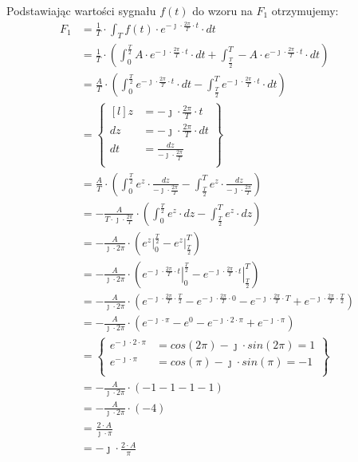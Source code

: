 \begin{task}
Podstawiając wartości sygnału $f(t)$ do wzoru na $F_1$ otrzymujemy:
\begin{align*}
F_1&=\frac{1}{T} \cdot \int_{T}f(t) \cdot e^{-\jmath \cdot \frac{2\pi}{T} \cdot t} \cdot dt\\
&=\frac{1}{T} \cdot \left(\int_{0}^{\frac{T}{2}}A \cdot e^{-\jmath \cdot \frac{2\pi}{T} \cdot t} \cdot dt + \int_{\frac{T}{2}}^{T}-A \cdot e^{-\jmath \cdot \frac{2\pi}{T} \cdot t} \cdot dt\right)\\
&=\frac{A}{T} \cdot \left(\int_{0}^{\frac{T}{2}}e^{-\jmath \cdot \frac{2\pi}{T} \cdot t} \cdot dt - \int_{\frac{T}{2}}^{T}e^{-\jmath \cdot \frac{2\pi}{T} \cdot t} \cdot dt\right)\\
&=\begin{Bmatrix*}[l]
z&=-\jmath \cdot \frac{2\pi}{T} \cdot t\\
dz&=-\jmath \cdot \frac{2\pi}{T} \cdot dt\\
dt&=\frac{dz}{-\jmath \cdot \frac{2\pi}{T}}\\
\end{Bmatrix*}\\
&=\frac{A}{T} \cdot \left(\int_{0}^{\frac{T}{2}} e^{z} \cdot \frac{dz}{-\jmath \cdot \frac{2\pi}{T}}-\int_{\frac{T}{2}}^{T} e^{z} \cdot \frac{dz}{-\jmath \cdot \frac{2\pi}{T}}\right)\\
&=-\frac{A}{T \cdot \jmath \cdot \frac{2\pi}{T}} \cdot \left(\int_{0}^{\frac{T}{2}} e^{z} \cdot dz - \int_{\frac{T}{2}}^{T} e^{z} \cdot dz\right)\\
&=-\frac{A}{\jmath \cdot 2 \pi} \cdot \left(\left. e^{z} \right|_{0}^{\frac{T}{2}} - \left. e^{z} \right|_{\frac{T}{2}}^{T}\right)\\
&=-\frac{A}{\jmath \cdot 2 \pi} \cdot \left(\left. e^{-\jmath \cdot \frac{2\pi}{T} \cdot t} \right|_{0}^{\frac{T}{2}} - \left. e^{-\jmath \cdot \frac{2\pi}{T} \cdot t} \right|_{\frac{T}{2}}^{T}\right)\\
&=-\frac{A}{\jmath \cdot 2 \pi} \cdot \left( e^{-\jmath \cdot \frac{2\pi}{T} \cdot \frac{T}{2}} - e^{-\jmath \cdot \frac{2\pi}{T} \cdot 0} -e^{-\jmath \cdot \frac{2\pi}{T} \cdot T} + e^{-\jmath \cdot \frac{2\pi}{T} \cdot \frac{T}{2}}\right)\\
&=-\frac{A}{\jmath \cdot 2 \pi} \cdot \left( e^{ -\jmath \cdot \pi } - e^{ 0} - e^{ -\jmath \cdot 2 \cdot \pi}+e^{ -\jmath \cdot \pi }\right)\\
&=\begin{Bmatrix}
e^{ -\jmath \cdot 2\cdot \pi }&=cos(2\pi)-\jmath \cdot sin(2\pi)=1\\
e^{ -\jmath \cdot \pi }&=cos(\pi)-\jmath \cdot sin(\pi)=-1\\
\end{Bmatrix}\\
&=-\frac{A}{\jmath \cdot 2 \pi} \cdot \left( -1 - 1 - 1 -1\right)\\
&=-\frac{A}{\jmath \cdot 2 \pi} \cdot \left( -4\right)\\
&=\frac{2 \cdot A}{\jmath \cdot \pi}\\
&=-\jmath \cdot \frac{2 \cdot A}{\pi}\\
\end{align*}


\end{task}
